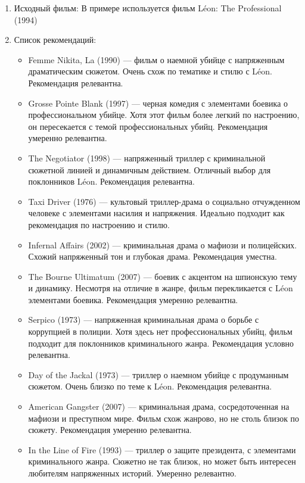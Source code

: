 \begin{enumerate}
\def\labelenumi{\arabic{enumi}.}
\item
  Исходный фильм: В примере используется фильм Léon: The
  Professional (1994)
\item
  Список рекомендаций:

  \begin{itemize}
  \tightlist
  \item
    Femme Nikita, La (1990) --- фильм о наемной убийце с
    напряженным драматическим сюжетом. Очень схож по тематике и стилю с
    Léon. Рекомендация релевантна.
  \item
    Grosse Pointe Blank (1997) --- черная комедия с элементами
    боевика о профессиональном убийце. Хотя этот фильм более легкий по
    настроению, он пересекается с темой профессиональных убийц.
    Рекомендация умеренно релевантна.
  \item
    The Negotiator (1998) --- напряженный триллер с
    криминальной сюжетной линией и динамичным действием. Отличный выбор
    для поклонников Léon. Рекомендация релевантна.
  \item
    Taxi Driver (1976) --- культовый триллер-драма о социально
    отчужденном человеке с элементами насилия и напряжения. Идеально
    подходит как рекомендация по настроению и стилю.
  \item
    Infernal Affairs (2002) --- криминальная драма о мафиози и
    полицейских. Схожий напряженный тон и глубокая драма. Рекомендация
    уместна.
  \item
    The Bourne Ultimatum (2007) --- боевик с акцентом на
    шпионскую тему и динамику. Несмотря на отличие в жанре, фильм
    перекликается с Léon элементами боевика. Рекомендация
    умеренно релевантна.
  \item
    Serpico (1973) --- напряженная криминальная драма о борьбе
    с коррупцией в полиции. Хотя здесь нет профессиональных убийц, фильм
    подходит для поклонников криминального жанра. Рекомендация условно
    релевантна.
  \item
    Day of the Jackal (1973) --- триллер о наемном убийце с
    продуманным сюжетом. Очень близко по теме к Léon.
    Рекомендация релевантна.
  \item
    American Gangster (2007) --- криминальная драма,
    сосредоточенная на мафиози и преступном мире. Фильм схож жанрово, но
    не столь близок по сюжету. Рекомендация умеренно релевантна.
  \item
    In the Line of Fire (1993) --- триллер о защите президента,
    с элементами криминального жанра. Сюжетно не так близок, но может
    быть интересен любителям напряженных историй. Умеренно релевантно.
  \end{itemize}
\end{enumerate}

